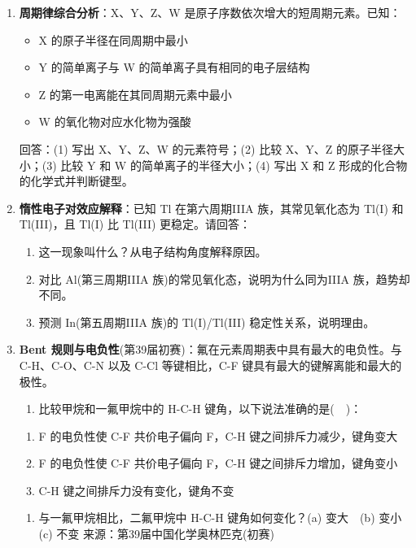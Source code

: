 \documentclass[a4paper,11pt]{ctexart}
\providecommand{\tightlist}{\setlength{\itemsep}{0pt}\setlength{\parskip}{0pt}}
\newcommand{\箭}{\ensuremath{\rightarrow}}
\newcommand{\左箭}{\ensuremath{\leftarrow}}
\newcommand{\上箭}{\ensuremath{\uparrow}}
\newcommand{\下箭}{\ensuremath{\downarrow}}
\newcommand{\衡}{\ensuremath{\rightleftharpoons}}
\newcommand{\双箭}{\ensuremath{\leftrightarrow}}
\newcommand{\约等于}{\ensuremath{\approx}}
\newcommand{\小于等于}{\ensuremath{\leq}}
\newcommand{\大于等于}{\ensuremath{\geq}}
\newcommand{\不等于}{\ensuremath{\neq}}
\newcommand{\西格马}{\ensuremath{\sigma}}
\newcommand{\派}{\ensuremath{\pi}}
\begin{document}
\begin{enumerate}
  请推断 A、B、C、D 的元素符号，并说明推理过程。
\item
  \textbf{周期律综合分析}：X、Y、Z、W 是原子序数依次增大的短周期元素。已知：

  \begin{itemize}
  \tightlist
  \item
    X 的原子半径在同周期中最小
  \item
    Y 的简单离子与 W 的简单离子具有相同的电子层结构
  \item
    Z 的第一电离能在其同周期元素中最小
  \item
    W 的氧化物对应水化物为强酸
  \end{itemize}

  回答：(1) 写出 X、Y、Z、W 的元素符号；(2) 比较 X、Y、Z 的原子半径大小；(3) 比较 Y 和 W 的简单离子的半径大小；(4) 写出 X 和 Z 形成的化合物的化学式并判断键型。
\item
  \textbf{惰性电子对效应解释}：已知 Tl 在第六周期IIIA 族，其常见氧化态为 Tl(I) 和 Tl(III)，且 Tl(I) 比 Tl(III) 更稳定。请回答：

  \begin{enumerate}
  \def\labelenumii{(\arabic{enumii})}
  \tightlist
  \item
    这一现象叫什么？从电子结构角度解释原因。
  \item
    对比 Al(第三周期IIIA 族)的常见氧化态，说明为什么同为IIIA 族，趋势却不同。
  \item
    预测 In(第五周期IIIA 族)的 Tl(I)/Tl(III) 稳定性关系，说明理由。
  \end{enumerate}
\item
  \textbf{Bent 规则与电负性}(第39届初赛)：氟在元素周期表中具有最大的电负性。与 C-H、C-O、C-N 以及 C-Cl 等键相比，C-F 键具有最大的键解离能和最大的极性。

  \begin{enumerate}
  \def\labelenumii{(\arabic{enumii})}
  \tightlist
  \item
    比较甲烷和一氟甲烷中的 H-C-H 键角，以下说法准确的是(　)：
  \end{enumerate}

  \begin{enumerate}
  \def\labelenumii{(\alph{enumii})}
  \tightlist
  \item
    F 的电负性使 C-F 共价电子偏向 F，C-H 键之间排斥力减少，键角变大
  \item
    F 的电负性使 C-F 共价电子偏向 F，C-H 键之间排斥力增加，键角变小
  \item
    C-H 键之间排斥力没有变化，键角不变
  \end{enumerate}

  \begin{enumerate}
  \def\labelenumii{(\arabic{enumii})}
  \setcounter{enumii}{1}
  \tightlist
  \item
    与一氟甲烷相比，二氟甲烷中 H-C-H 键角如何变化？(a) 变大　(b) 变小　(c) 不变
    来源：第39届中国化学奥林匹克(初赛)
  \end{enumerate}
\end{enumerate}
\end{document}
